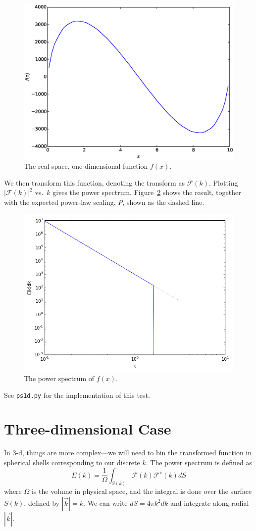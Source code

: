 \documentclass[11pt]{article}
\begin{document}
\begin{figure}[t]
\centering
\includegraphics[width=0.5\linewidth]{phi_1d}
\begin{minipage}[b]{0.45\linewidth}
\caption{\label{fig:phi1d} The real-space, one-dimensional function $f(x)$.}
\end{minipage}
\end{figure}

We then transform this function, denoting the transform as $\mathcal{F}(k)$.  Plotting
$|\mathcal{F}(k)|^2$ vs.\ $k$ gives the power spectrum.  Figure~\ref{fig:ps1d} shows
the result, together with the expected power-law scaling, $P$, shown as the 
dashed line.

\begin{figure}[t]
\centering
\includegraphics[width=0.5\linewidth]{ps1d}
\begin{minipage}[b]{0.45\linewidth}
\caption{\label{fig:ps1d} The power spectrum of $f(x)$.}
\end{minipage}
\end{figure}



See {\tt ps1d.py} for the implementation of this test.



\section*{Three-dimensional Case}

In 3-d, things are more complex---we will need to bin the transformed
function in spherical shells corresponding to our discrete $k$.  The
power spectrum is defined as
\begin{equation}
E(k) = \frac{1}{\Omega} \int_{S(k)} \mathcal{F}(k) \mathcal{F}^\star(k) dS
\end{equation}
where $\Omega$ is the volume in physical space, and the integral is done
over the surface $S(k)$, defined by $|\vec{k}| = k$.  We can
write $dS = 4\pi k^2 dk$ and integrate along radial $|\vec{k}|$.
\end{document}
